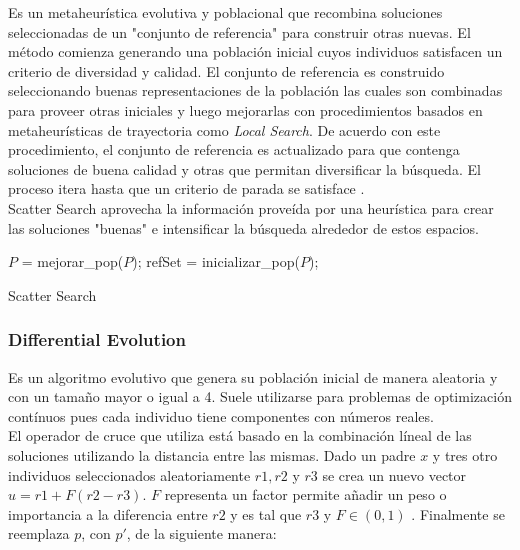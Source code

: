 \documentclass{ci5652}
\begin{document}
Es un metaheurística evolutiva y poblacional que recombina soluciones 
seleccionadas de un "conjunto de referencia" para construir otras nuevas. El
método comienza generando una población inicial cuyos individuos satisfacen un
criterio de diversidad y calidad. El conjunto de referencia es construido
seleccionando buenas representaciones de la población las cuales son combinadas
para proveer otras iniciales y luego mejorarlas con procedimientos basados en
metaheurísticas de trayectoria como \textit{Local Search}. De acuerdo con este
procedimiento, el conjunto de referencia es actualizado para que contenga
soluciones de buena calidad y otras que permitan diversificar la búsqueda. El
proceso itera hasta que un criterio de parada se satisface \cite{Talbi_2009}.\\

Scatter Search aprovecha la información proveída por una heurística para crear
las soluciones "buenas" e intensificar la búsqueda alrededor de estos espacios. 

\begin{algorithm}
 \DontPrintSemicolon
 \vspace*{0.1cm}
  $P$ = mejorar\_pop($P$);\;
  refSet = inicializar\_pop($P$);\;
 \vspace*{0.1cm}
 \caption{Scatter Search}
\end{algorithm}


\subsubsection{Differential Evolution}

Es un algoritmo evolutivo que genera su población inicial de manera aleatoria y
con un tamaño mayor o igual a 4. Suele utilizarse para problemas de optimización
contínuos pues cada individuo tiene componentes con números reales.\\ 

El operador de cruce que utiliza está basado en la combinación líneal de las
soluciones utilizando la distancia entre las mismas. Dado un padre $x$ y tres
otro individuos seleccionados aleatoriamente $r1, r2$ y $r3$ se crea un nuevo
vector $u = r1 + F(r2 - r3)$. $F$ representa un factor permite añadir un peso o
importancia a la diferencia entre $r2$ y es tal que $r3$ y $F \in (0, 1)$
\cite{Glover_2003}. Finalmente se reemplaza $p$, con $p'$, de la
siguiente manera: 
\end{document}
